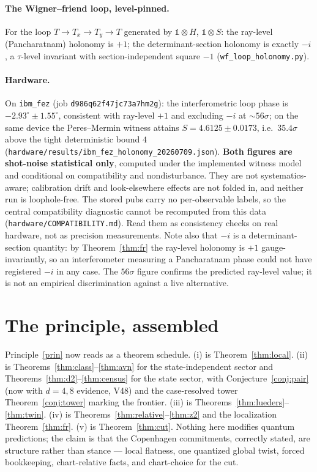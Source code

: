 \documentclass[11pt]{article}
\theoremstyle{definition}
\theoremstyle{remark}
\begin{document}
\paragraph{The Wigner--friend loop, level-pinned.}
For the loop $T\to T_x\to T_y\to T$ generated by $\mathbb 1\otimes H$, $\mathbb
1\otimes S$: the ray-level (Pancharatnam) holonomy is $+1$; the determinant-section
holonomy is exactly $-i$, a $\tau$-level invariant with section-independent square
$-1$ (\texttt{wf\_loop\_holonomy.py}).

\paragraph{Hardware.}
On \texttt{ibm\_fez} (job \texttt{d986q62f47jc73a7hm2g}): the interferometric loop
phase is $-2.93^\circ\pm1.55^\circ$, consistent with ray-level $+1$ and excluding $-i$
at ${\sim}56\sigma$; on the same device the Peres--Mermin witness attains
$S=4.6125\pm0.0173$, i.e.\ $35.4\sigma$ above the tight deterministic bound $4$
(\texttt{hardware/results/ibm\_fez\_holonomy\_20260709.json}). \textbf{Both figures are
shot-noise statistical only}, computed under the implemented witness model and conditional
on compatibility and nondisturbance. They are not systematics-aware; calibration drift and
look-elsewhere effects are not folded in, and neither run is loophole-free. The stored pubs
carry no per-observable labels, so the central compatibility diagnostic cannot be recomputed
from this data (\texttt{hardware/COMPATIBILITY.md}). Read them as consistency checks on real
hardware, not as precision measurements. Note also that $-i$ is a determinant-section
quantity: by Theorem~\ref{thm:fr} the ray-level holonomy is $+1$ gauge-invariantly, so an
interferometer measuring a Pancharatnam phase could not have registered $-i$ in any case.
The $56\sigma$ figure confirms the predicted ray-level value; it is not an empirical
discrimination against a live alternative.

\section{The principle, assembled}\label{sec:assembled}
Principle~\ref{prin} now reads as a theorem schedule. (i) is
Theorem~\ref{thm:local}. (ii) is Theorems~\ref{thm:class}--\ref{thm:avn} for the
state-independent sector and Theorems~\ref{thm:d2}--\ref{thm:census} for the state
sector, with Conjecture~\ref{conj:pair} (now with $d=4,8$ evidence, V48) and the
case-resolved tower Theorem~\ref{conj:tower} marking the frontier. (iii)
is Theorems~\ref{thm:lueders}--\ref{thm:twin}. (iv) is
Theorems~\ref{thm:relative}--\ref{thm:z2} and the localization
Theorem~\ref{thm:fr}. (v) is Theorem~\ref{thm:cut}. Nothing here modifies quantum
predictions; the claim is that the Copenhagen commitments, correctly stated, are
structure rather than stance --- local flatness, one quantized global twist, forced
bookkeeping, chart-relative facts, and chart-choice for the cut.
\end{document}
